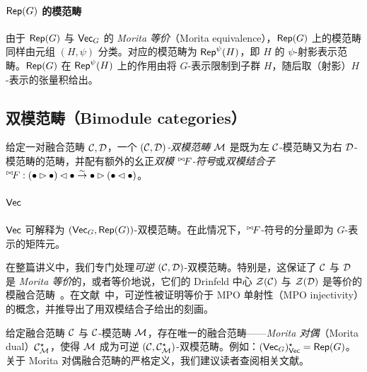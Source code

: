 \paragraph{$\mathsf{Rep}(G)$ 的模范畴} 由于 $\mathsf{Rep}(G)$ 与 $\mathsf{Vec}_G$ 的 \emph{Morita 等价}（Morita equivalence），$\mathsf{Rep}(G)$ 上的模范畴同样由元组 $(H,\psi)$ 分类。对应的模范畴为 $\mathsf{Rep}^\psi(H)$，即 $H$ 的 $\psi$-射影表示范畴。$\mathsf{Rep}(G)$ 在 $\mathsf{Rep}^\psi(H)$ 上的作用由将 $G$-表示限制到子群 $H$，随后取（射影）$H$-表示的张量积给出。

\subsection{双模范畴（Bimodule categories）}
给定一对融合范畴 $\mathcal C,\mathcal D$，一个 \emph{$(\mathcal C,\mathcal D)$-双模范畴} $\mathcal M$ 是既为左 $\mathcal C$-模范畴又为右 $\mathcal D$-模范畴的范畴，并配有额外的幺正\emph{双模 ${}^{\bowtie\!} F$-符号}或\emph{双模结合子} ${}^{\bowtie\!} F:(\bullet \rhd \bullet)\lhd\bullet \overset{\sim}{\rightarrow} \bullet\rhd(\bullet\lhd\bullet)$。

\paragraph{$\mathsf{Vec}$} $\mathsf{Vec}$ 可解释为 $(\mathsf{Vec}_G,\mathsf{Rep}(G))$-双模范畴。在此情况下，${}^{\bowtie\!} F$-符号的分量即为 $G$-表示的矩阵元。

\bigskip\noindent 在整篇讲义中，我们专门处理\emph{可逆} $(\mathcal C,\mathcal D)$-双模范畴。特别是，这保证了 $\mathcal C$ 与 $\mathcal D$ 是 \emph{Morita 等价}的，或者等价地说，它们的 Drinfeld 中心 $\mathcal Z(\mathcal C)$ 与 $\mathcal Z(\mathcal D)$ 是等价的模融合范畴~\cite{Mueger2002}。在文献~\cite{Bridgeman2022}中，可逆性被证明等价于 MPO 单射性（MPO injectivity）的概念，并推导出了用双模结合子给出的刻画。

给定融合范畴 $\mathcal C$ 与 $\mathcal C$-模范畴 $\mathcal M$，存在唯一的融合范畴——\emph{Morita 对偶}（Morita dual）$\mathcal C^\star_\mathcal M$，使得 $\mathcal M$ 成为可逆 $(\mathcal C,\mathcal C^\star_\mathcal M)$-双模范畴。例如：$(\mathsf{Vec}_G)^\star_{\mathsf{Vec}}=\mathsf{Rep}(G)$。关于 Morita 对偶融合范畴的严格定义，我们建议读者查阅相关文献。